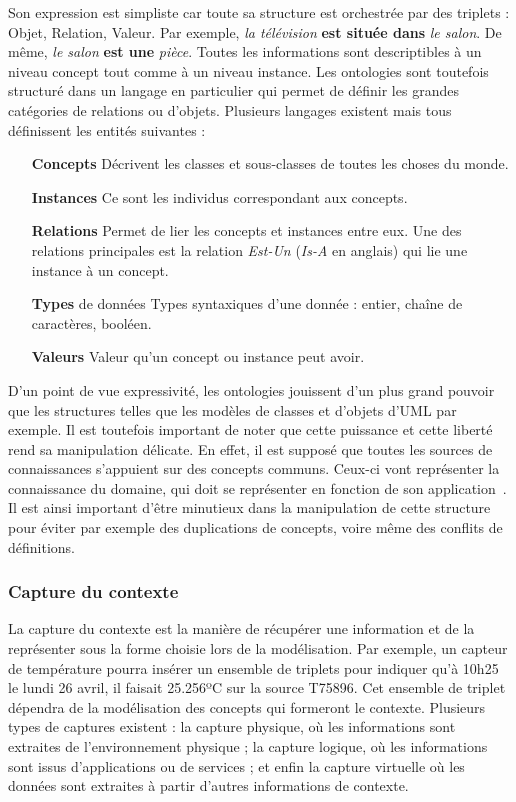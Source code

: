 Son expression est simpliste car toute sa structure est orchestrée par des triplets : Objet, Relation, Valeur. Par exemple, \textit{la télévision} \textbf{est située dans} \textit{le salon}. De même, \textit{le salon} \textbf{est une} \textit{pièce}. Toutes les informations sont descriptibles à un niveau concept tout comme à un niveau instance. Les ontologies sont toutefois structuré dans un langage en particulier qui permet de définir les grandes catégories de relations ou d'objets. Plusieurs langages existent mais tous définissent les entités suivantes :
\begin{itemize}
    \item[\textbf{Concepts}] Décrivent les classes et sous-classes de toutes les choses du monde.
    \item[\textbf{Instances}] Ce sont les individus correspondant aux concepts.
    \item[\textbf{Relations}] Permet de lier les concepts et instances entre eux. Une des relations principales est la relation \textit{Est-Un} (\textit{Is-A} en anglais) qui lie une instance à un concept.
    \item[\textbf{Types} de données] Types syntaxiques d'une donnée : entier, chaîne de caractères, booléen.
    \item[\textbf{Valeurs}] Valeur qu'un concept ou instance peut avoir.
\end{itemize}

D'un point de vue expressivité, les ontologies jouissent d'un plus grand pouvoir que les structures telles que les modèles de classes et d'objets d'UML par exemple. Il est toutefois important de noter que cette puissance et cette liberté rend sa manipulation délicate. En effet, il est supposé que toutes les sources de connaissances s'appuient sur des concepts communs. Ceux-ci vont représenter la connaissance du domaine, qui doit se représenter en fonction de son application~\cite{CitationsCharbelpage77}. Il est ainsi important d'être minutieux dans la manipulation de cette structure pour éviter par exemple des duplications de concepts, voire même des conflits de définitions.


\subsubsection{Capture du contexte}
La capture du contexte est la manière de récupérer une information et de la représenter sous la forme choisie lors de la modélisation. Par exemple, un capteur de température pourra insérer un ensemble de triplets pour indiquer qu'à 10h25 le lundi 26 avril, il faisait 25.256ºC sur la source T75896. Cet ensemble de triplet dépendra de la modélisation des concepts qui formeront le contexte. Plusieurs types de captures existent : la capture physique, où les informations sont extraites de l'environnement physique ; la capture logique, où les informations sont issus d'applications ou de services ; et enfin la capture virtuelle où les données sont extraites à partir d'autres informations de contexte.

